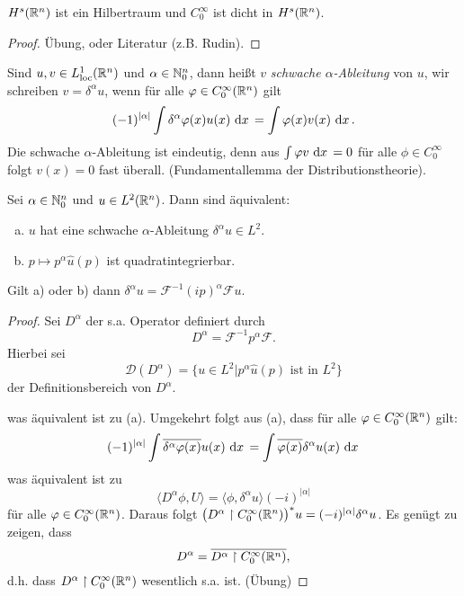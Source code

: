 \documentclass{mycourse}
\begin{document}
\begin{st} 
$H^s(\mathbb{R}^n)$ ist ein Hilbertraum und $C_0^\infty$ ist dicht in $H^s(\mathbb{R}^n)$.
\end{st}
\begin{proof}
Übung, oder Literatur (z.B. Rudin).
\end{proof}
\begin{df}
Sind $u,v\in L^1_{\text{loc}}(\mathbb{R}^n)$ und $\alpha \in \mathbb{N}_0^n$, dann heißt $v$ \emph{schwache $\alpha$-Ableitung} von $u$, wir schreiben $v=\delta^\alpha u$, wenn für alle $\varphi \in C_0^\infty (\mathbb{R}^n)$ gilt
\[
(-1)^{|\alpha|} \int \delta^\alpha \varphi(x) u(x) \, \,\mathrm{d}x\, = \int \varphi(x) v(x) \, \,\mathrm{d}x\,.
\] 
Die schwache $\alpha$-Ableitung ist eindeutig, denn aus $\int \varphi v \, \,\mathrm{d}x\,=0$ für alle $\phi \in C_0^\infty$ folgt $v(x)=0$ fast überall. (Fundamentallemma der Distributionstheorie).
\end{df}

\begin{st}\label{4.5}
Sei $\alpha\in \mathbb{N}_0^n$ und $u\in L^2(\mathbb{R}^n)$. Dann sind äquivalent:
\begin{enumerate}[a)]
\item$u$ hat eine schwache $\alpha$-Ableitung $\delta^\alpha u\in L^2$.
\item $p \mapsto p^\alpha \hat u(p)$ ist quadratintegrierbar.
\end{enumerate}
Gilt a) oder b) dann $\delta^\alpha u = \mathcal F^{-1} (ip)^\alpha \mathcal Fu$.
\end{st}
\begin{proof}
Sei $D^\alpha$ der s.a. Operator definiert durch
\[
D^\alpha = \mathcal F^{-1} p^\alpha \mathcal F.
\]
Hierbei sei 
\[
\mathcal D(D^\alpha) = \{ u \in L^2| p^{\alpha} \hat u(p) \text{ ist in } L^2\}
\]
der Definitionsbereich von $D^\alpha$. 
\fixme

was äquivalent ist zu (a). Umgekehrt folgt aus (a), dass für alle $\varphi \in C_0^\infty(\mathbb{R}^n)$ gilt:
\[
(-1)^{|\alpha|} \int \overline{\delta^\alpha \varphi(x)} u(x) \, \,\mathrm{d}x\, = \int \overline{\varphi(x)} \delta^\alpha u(x) \, \,\mathrm{d}x\,
\]
was äquivalent ist zu
\[
\langle D^\alpha \phi, U \rangle = \langle \phi, \delta^\alpha u \rangle (-i)^{|\alpha|}
\]
für alle $\varphi \in C_0^\infty(\mathbb{R}^n)$. Daraus folgt
$\big(D^\alpha\upharpoonright C_0^\infty(\mathbb{R}^n)\big)^*u= (-i)^{|\alpha|} \delta^\alpha u$. Es genügt zu zeigen, dass
\[
D^\alpha = \overline{D^\alpha \upharpoonright C_0^\infty(\mathbb{R}^n)},
\]
d.h. dass $D^\alpha \upharpoonright C_0^\infty(\mathbb{R}^n)$ wesentlich s.a. ist. (Übung)
\end{proof}
\end{document}
